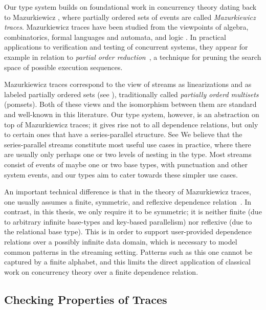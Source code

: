 Our type system builds on foundational work in concurrency theory dating back to Mazurkiewicz \cite{mazurkiewicz1986trace}, where partially ordered sets of events are called \emph{Mazurkiewicz traces}. Mazurkiewicz traces have been studied from the viewpoints of algebra, combinatorics, formal languages and automata, and
logic \cite{DiekertR1995}. In practical applications to verification and
testing of concurrent systems, they appear for example in relation to
\emph{partial order reduction}~\cite{God96,Peled94}, a technique for
pruning the search space of possible execution sequences.

Mazurkiewicz traces correspond to the view of streams as linearizations and as labeled partially ordered sets (see ),
traditionally called \emph{partially orderd multisets} (pomsets).
Both of these views and the isomorphism between them are standard and well-known in this literature.
Our type system, however, is an abstraction on top of Mazurkiewicz traces; it
gives rise not to all dependence relations, but only to certain ones that have a series-parallel structure.
See 
We believe that the series-parallel streams constitute most useful use cases in practice, where there are usually only perhaps one or two levels of nesting in the type. Most streams consist of events of maybe one or two base types, with punctuation and other system events, and our types aim to cater towards these simpler use cases.

An important technical difference is that in the theory of Mazurkiewicz traces, one usually assumes a finite, symmetric, and reflexive dependence relation~\cite{DiekertR1995}. In contrast, in this thesis, we only require it to be symmetric; it is neither finite (due to arbitrary infinite base-types and key-based parallelism) nor reflexive (due to the relational base type). This is in order to support user-provided dependence relations over a possibly infinite data domain, which is necessary to model common patterns in the streaming setting. Patterns such as this one cannot be captured by a finite alphabet, and this limits the direct application of classical work on concurrency theory over a finite dependence relation.

\subsection{Checking Properties of Traces}


